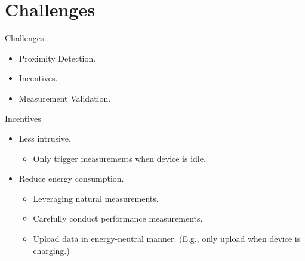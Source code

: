 \section{Challenges}

\begin{frame}{Challenges}
  \begin{itemize}
    \item Proximity Detection.
    \item Incentives.
    \item Measurement Validation.
  \end{itemize}
\end{frame}

\begin{frame}{Incentives}
  \begin{itemize}
    \item Less intrusive.
      \begin{itemize}
        \item Only trigger measurements when device is idle.
      \end{itemize}
    \item Reduce energy consumption.
      \begin{itemize}
        \item Leveraging natural measurements.
        \item Carefully conduct performance measurements.
        \item Upload data in energy-neutral manner. (E.g., only upload when device is charging.)
      \end{itemize}
  \end{itemize}
\end{frame}

